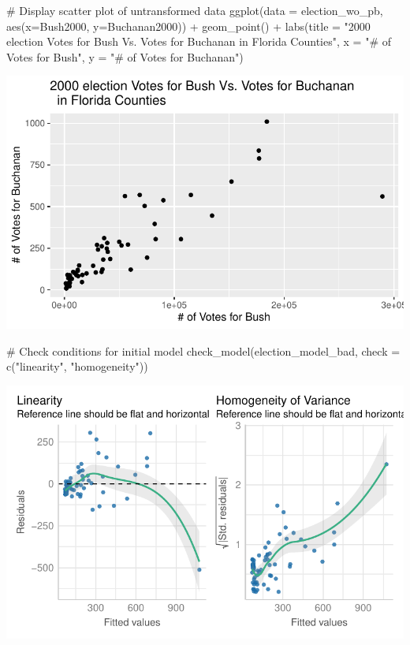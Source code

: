 \documentclass[
  letterpaper,
  DIV=11,
  numbers=noendperiod]{scrartcl}
\newenvironment{Shaded}{\begin{snugshade}}{\end{snugshade}}
\newcommand{\AttributeTok}[1]{\textcolor[rgb]{0.40,0.45,0.13}{#1}}
\newcommand{\CommentTok}[1]{\textcolor[rgb]{0.37,0.37,0.37}{#1}}
\newcommand{\FunctionTok}[1]{\textcolor[rgb]{0.28,0.35,0.67}{#1}}
\newcommand{\NormalTok}[1]{\textcolor[rgb]{0.00,0.23,0.31}{#1}}
\newcommand{\SpecialCharTok}[1]{\textcolor[rgb]{0.37,0.37,0.37}{#1}}
\newcommand{\StringTok}[1]{\textcolor[rgb]{0.13,0.47,0.30}{#1}}
\begin{document}
\begin{Shaded}
\begin{Highlighting}[]
\CommentTok{\# Display scatter plot of untransformed data }
\FunctionTok{ggplot}\NormalTok{(}\AttributeTok{data =}\NormalTok{ election\_wo\_pb, }\FunctionTok{aes}\NormalTok{(}\AttributeTok{x=}\NormalTok{Bush2000, }
                                  \AttributeTok{y=}\NormalTok{Buchanan2000))  }\SpecialCharTok{+} 
  \FunctionTok{geom\_point}\NormalTok{() }\SpecialCharTok{+} 
  \FunctionTok{labs}\NormalTok{(}\AttributeTok{title =} \StringTok{"2000 election Votes for Bush Vs. Votes for Buchanan }
\StringTok{  in Florida Counties"}\NormalTok{,}
       \AttributeTok{x =} \StringTok{"\# of Votes for Bush"}\NormalTok{,}
       \AttributeTok{y =} \StringTok{"\# of Votes for Buchanan"}\NormalTok{)}
\end{Highlighting}
\end{Shaded}

\includegraphics{case-study-template_files/figure-pdf/unnamed-chunk-6-1.pdf}

\begin{Shaded}
\begin{Highlighting}[]
\CommentTok{\# Check conditions for initial model }
\FunctionTok{check\_model}\NormalTok{(election\_model\_bad, }\AttributeTok{check =} \FunctionTok{c}\NormalTok{(}\StringTok{"linearity"}\NormalTok{, }\StringTok{"homogeneity"}\NormalTok{))}
\end{Highlighting}
\end{Shaded}

\includegraphics{case-study-template_files/figure-pdf/unnamed-chunk-6-2.pdf}
\end{document}
